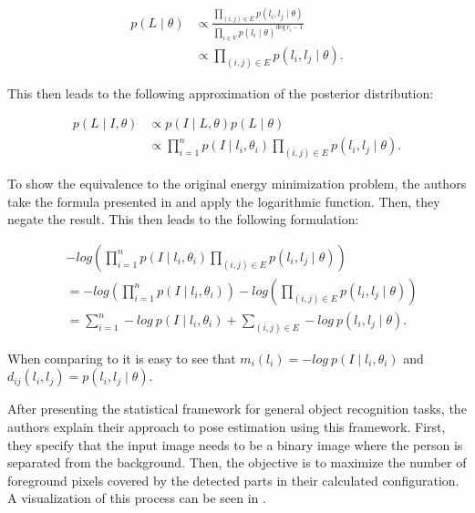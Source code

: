 \begin{equation}
    \begin{split}
        p(L \mid \theta) 
        &\propto \frac{\prod_{(i,j) \in E} p(l_i, l_j \mid \theta)}{\prod_{i \in V} p(l_i \mid \theta)^{\text{deg} ~ v_i -1}} \\
        &\propto \prod_{(i, j) \in E} p(l_i, l_j \mid \theta).
    \end{split}
\end{equation}

This then leads to the following approximation of the posterior distribution:

\begin{equation}
    \label{eq:pictoral-posterior-general}
    \begin{split}
        p(L \mid I, \theta) 
        &\propto p(I \mid L, \theta) p(L \mid \theta) \\
        &\propto \prod_{i=1}^n p(I \mid l_i, \theta_i) \prod_{(i, j) \in E} p(l_i, l_j \mid \theta).
    \end{split} 
\end{equation}

To show the equivalence to the original energy minimization problem, the authors take the formula presented in  and apply the logarithmic function. Then, they negate the result.
This then leads to the following formulation:

\begin{equation}
    \label{eq:neg-log-posterior}
    \begin{split}
        &-log \left( \prod_{i=1}^n p(I \mid l_i, \theta_i) \prod_{(i, j) \in E} p(l_i, l_j \mid \theta) \right) \\
        &= -log \left( \prod_{i=1}^n p(I \mid l_i, \theta_i) \right) - log \left( \prod_{(i, j) \in E} p(l_i, l_j \mid \theta)\right) \\
        &= \sum_{i=1}^n -log ~ p(I \mid l_i, \theta_i) + \sum_{(i, j) \in E} - log ~ p(l_i, l_j \mid \theta).
    \end{split}
\end{equation}

When comparing  to  it is easy to see that $m_i(l_i) = - log ~ p(I \mid l_i, \theta_i)$ and $d_{ij}(l_i, l_j) = p(l_i, l_j \mid \theta)$.

After presenting the statistical framework for general object recognition tasks, the authors explain their approach to pose estimation using this framework.
First, they specify that the input image needs to be a binary image where the person is separated from the background.
Then, the objective is to maximize the number of foreground pixels covered by the detected parts in their calculated configuration.
A visualization of this process can be seen in .

